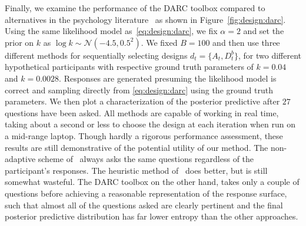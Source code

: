 Finally, we examine the performance of the DARC toolbox compared to alternatives in the
psychology literature~\citep{Kirby:2009eu,Frye:2016eu} as shown in Figure~\ref{fig:design:darc}.  Using the
same likelihood model as~\eqref{eq:design:darc},
we fix $\alpha=2$ and set the prior on $k$ as $\log k \sim \mathcal{N}(-4.5,0.5^2)$.  We fixed $B=100$ and
then use three different methods for sequentially selecting designs $d_t = \{A_t,D^b_t\}$, for
two different hypothetical participants with respective ground truth parameters of $k=0.04$ and $k=0.0028$.
Responses are generated presuming the likelihood model is correct and sampling directly from
\eqref{eq:design:darc} using the ground truth parameters.  We then plot a characterization of the posterior
predictive after $27$ questions have been asked.  All methods are capable of working in real time, taking
about a second or less to choose the design at each iteration when run on a mid-range laptop.  Though 
hardly a rigorous performance assessment, these results are still demonstrative of the potential utility of our
method.  The non-adaptive scheme of~\cite{Kirby:2009eu} always asks the same questions regardless of
the participant's responses.  The heuristic method of~\cite{Frye:2016eu} does better, but is still somewhat
wasteful.  The DARC toolbox on the other hand, takes only a couple of questions before achieving a
reasonable representation of the response surface, such that almost all of the questions asked are clearly
pertinent and the final posterior predictive distribution has far lower entropy than the other approaches.